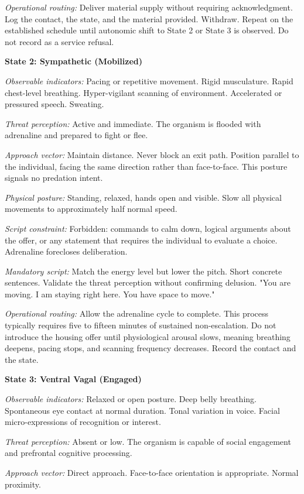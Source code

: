 \documentclass[12pt, letterpaper]{article}
\begin{document}
\textit{Operational routing:} Deliver material supply without requiring acknowledgment. Log the contact, the state, and the material provided. Withdraw. Repeat on the established schedule until autonomic shift to State 2 or State 3 is observed. Do not record as a service refusal.

\textbf{State 2: Sympathetic (Mobilized)}

\textit{Observable indicators:} Pacing or repetitive movement. Rigid musculature. Rapid chest-level breathing. Hyper-vigilant scanning of environment. Accelerated or pressured speech. Sweating.

\textit{Threat perception:} Active and immediate. The organism is flooded with adrenaline and prepared to fight or flee.

\textit{Approach vector:} Maintain distance. Never block an exit path. Position parallel to the individual, facing the same direction rather than face-to-face. This posture signals no predation intent.

\textit{Physical posture:} Standing, relaxed, hands open and visible. Slow all physical movements to approximately half normal speed.

\textit{Script constraint:} Forbidden: commands to calm down, logical arguments about the offer, or any statement that requires the individual to evaluate a choice. Adrenaline forecloses deliberation.

\textit{Mandatory script:} Match the energy level but lower the pitch. Short concrete sentences. Validate the threat perception without confirming delusion. "You are moving. I am staying right here. You have space to move."

\textit{Operational routing:} Allow the adrenaline cycle to complete. This process typically requires five to fifteen minutes of sustained non-escalation. Do not introduce the housing offer until physiological arousal slows, meaning breathing deepens, pacing stops, and scanning frequency decreases. Record the contact and the state.

\textbf{State 3: Ventral Vagal (Engaged)}

\textit{Observable indicators:} Relaxed or open posture. Deep belly breathing. Spontaneous eye contact at normal duration. Tonal variation in voice. Facial micro-expressions of recognition or interest.

\textit{Threat perception:} Absent or low. The organism is capable of social engagement and prefrontal cognitive processing.

\textit{Approach vector:} Direct approach. Face-to-face orientation is appropriate. Normal proximity.
\end{document}
